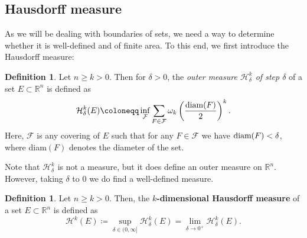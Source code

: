 \documentclass[artcle, 11pt, reqno]{amsart}
\numberwithin{equation}{section}
\newcommand{\R}{\mathbb{R}}
\newcommand{\N}{\mathbb{N}}
\newcommand{\ninfty}{n \rightarrow \infty}
\newcommand{\dd}{\: d}
\theoremstyle{plain}
\theoremstyle{definition}
\newtheorem{definition}[theorem]{Definition}
\theoremstyle{remark}
\begin{document}

	
	
	
	\subsection{Hausdorff measure}
	As we will be dealing with boundaries of sets, we need a way to determine whether it is well-defined and of finite area. To this end, we first introduce the Hausdorff measure:
	
	\begin{definition}
		Let $n \geq k>0$. Then for $\delta > 0$, the \emph{outer measure $\mathcal{H}^k_{\delta}$ of step $\delta$} of a set $E \subset \R^n$ is defined as 
		\[
		\mathcal{H}^k_{\delta}(E) \coloneqq \inf_{\mathcal{F}} \sum_{F \in \mathcal{F}} \omega_k \left( \frac{\textnormal{diam}(F)}{2} \right) ^k.
		\]
		Here, $\mathcal{F}$ is any covering of $E$ such that for any $F \in \mathcal{F}$ we have $ \textnormal{diam}(F)<\delta$, where diam$(F)$ denotes the diameter of the set.
	\end{definition}
	Note that $\mathcal{H}^k_\delta$ is not a measure, but it does define an outer measure on $\R^n$. However, taking $\delta$ to 0 we do find a well-defined measure.
	
	\begin{definition} \label{DefHausdM}
		Let $n \geq k>0$. Then, the \textbf{$k$-dimensional Hausdorff measure} of a set $E \subset \R^n$ is defined as
		\[
		\mathcal{H}^k(E) \coloneqq \sup_{\delta \in (0, \infty]} \mathcal{H}^k_\delta(E) = \lim_{\delta \to 0^+} \mathcal{H}^k_\delta(E).
		\]
	\end{definition}
	
\end{document}
